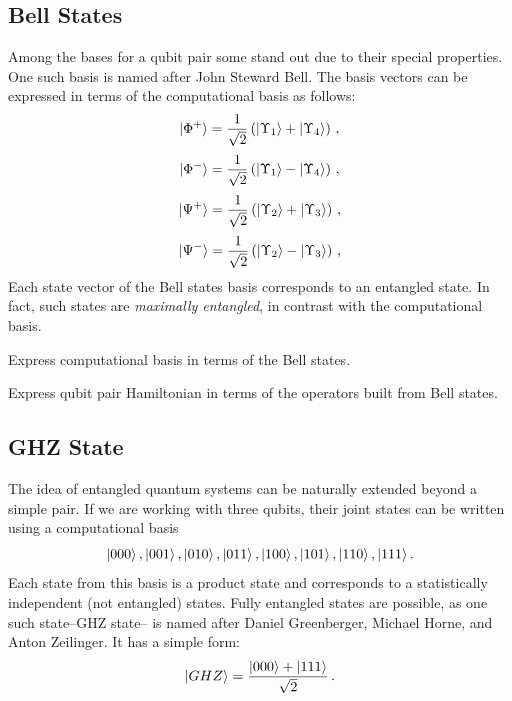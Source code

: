 \subsection{Bell States}
Among the bases for a qubit pair some stand out due to their special properties. One such basis is named after John Steward Bell. The basis vectors can be expressed in terms of the computational basis as follows:
\begin{equation}
	|{\Phi^{+}}\rangle = \frac{1}{\sqrt{2}}\left(|{\Upsilon_1}\rangle+|{\Upsilon_4}\rangle\right)\,,
\end{equation}
\begin{equation}
	|{\Phi^{-}}\rangle = \frac{1}{\sqrt{2}}\left(|{\Upsilon_1}\rangle-|{\Upsilon_4}\rangle\right)\,,
\end{equation}
\begin{equation}
	|{\Psi^{+}}\rangle = \frac{1}{\sqrt{2}}\left(|{\Upsilon_2}\rangle+|{\Upsilon_3}\rangle\right)\,,
\end{equation}
\begin{equation}
	|{\Psi^{-}}\rangle = \frac{1}{\sqrt{2}}\left(|{\Upsilon_2}\rangle-|{\Upsilon_3}\rangle\right)\,,
\end{equation}
Each state vector of the Bell states basis corresponds to an entangled state. In fact, such states are \emph{maximally entangled}, in contrast with the computational basis.

\begin{exercise}
	Express computational basis in terms of the Bell states.
\end{exercise}
\begin{exercise}
	Express qubit pair Hamiltonian in terms of the operators built from Bell states.
\end{exercise}


\subsection{GHZ State}\label{sec:GHZState}
The idea of entangled quantum systems can be naturally extended beyond a simple pair. If we are working with three qubits, their joint states can be written using a computational basis
\[
|{000}\rangle\,,|{001}\rangle\,,|{010}\rangle\,,|{011}\rangle\,,|{100}\rangle\,,|{101}\rangle\,,|{110}\rangle\,,|{111}\rangle\,.
\]
Each state from this basis is a product state and corresponds to a statistically independent (not entangled) states. Fully entangled states are possible, as one such state--GHZ state-- is named after Daniel Greenberger, Michael Horne, and Anton Zeilinger. It has a simple form:
\[
|{GHZ}\rangle=\frac{|{000}\rangle+|{111}\rangle}{\sqrt{2}}\,.
\]

